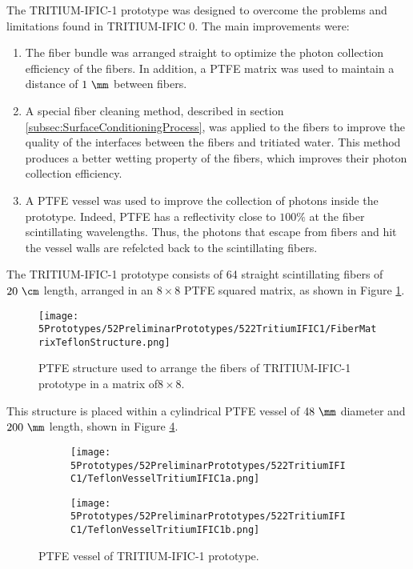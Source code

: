 The TRITIUM-IFIC-1 prototype was designed to overcome the problems and limitations found in TRITIUM-IFIC 0. The main improvements were:

\begin{enumerate}

\item{} The fiber bundle was arranged straight to optimize the photon collection efficiency of the fibers. In addition, a PTFE matrix was used to maintain a distance of $1~\mm$ between fibers.

\item{} A special fiber cleaning method, described in section \ref{subsec:SurfaceConditioningProcess}, was applied to the fibers to improve the quality of the interfaces between the fibers and tritiated water. This method produces a better wetting property of the fibers, which improves their photon collection efficiency.

\item{} A PTFE vessel was used to improve the collection of photons inside the prototype. Indeed, PTFE has a reflectivity close to $100\%$ at the fiber scintillating wavelengths. Thus, the photons that escape from fibers and hit the vessel walls are refelcted back to the scintillating fibers.

\end{enumerate}

The TRITIUM-IFIC-1 prototype consists of 64 straight scintillating fibers of $20~\cm$ length, arranged in an $8\times 8$ PTFE squared matrix, as shown in Figure \ref{fig:TeflonStructureFibersTritiumIFIC1}.

\begin{figure}[h]
\centering
\texttt{[image: 5Prototypes/52PreliminarPrototypes/522TritiumIFIC1/FiberMatrixTeflonStructure.png]}
\caption{PTFE structure used to arrange the fibers of TRITIUM-IFIC-1 prototype in a matrix of$8 \times 8$.\label{fig:TeflonStructureFibersTritiumIFIC1}}
\end{figure}
This structure is placed within a cylindrical PTFE vessel of $48~\mm$ diameter and $200~\mm$ length, shown in Figure \ref{fig:TeflonVesselTritumIFIC1}. 

\begin{figure}
\centering
    \begin{subfigure}[b]{0.30\textwidth}
    \centering
    \texttt{[image: 5Prototypes/52PreliminarPrototypes/522TritiumIFIC1/TeflonVesselTritiumIFIC1a.png]}  
    \caption{\label{subfig:TeflonVesselTritumIFIC1a}}
    \end{subfigure}
    \hfill
    \begin{subfigure}[b]{0.45\textwidth}
    \centering
    \texttt{[image: 5Prototypes/52PreliminarPrototypes/522TritiumIFIC1/TeflonVesselTritiumIFIC1b.png]}  
    \caption{\label{subfig:TeflonVesselTritumIFIC1b}}
    \end{subfigure}
 \caption{PTFE vessel of TRITIUM-IFIC-1 prototype.}
 \label{fig:TeflonVesselTritumIFIC1}
\end{figure}


